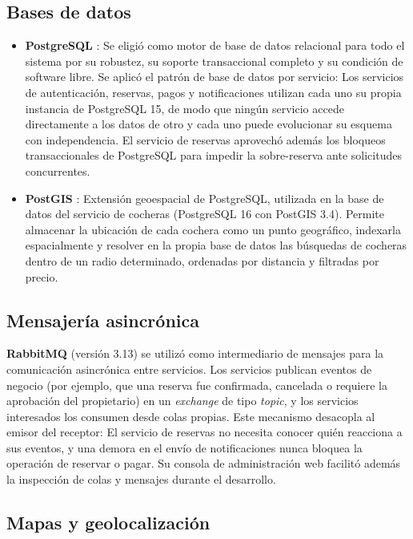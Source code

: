 \subsection{Bases de datos}

\begin{itemize}
    \item \textbf{PostgreSQL} \autocite{postgresql}: Se eligió como motor de base de datos relacional para todo el sistema por su robustez, su soporte transaccional completo y su condición de software libre. Se aplicó el patrón de base de datos por servicio: Los servicios de autenticación, reservas, pagos y notificaciones utilizan cada uno su propia instancia de PostgreSQL 15, de modo que ningún servicio accede directamente a los datos de otro y cada uno puede evolucionar su esquema con independencia. El servicio de reservas aprovechó además los bloqueos transaccionales de PostgreSQL para impedir la sobre-reserva ante solicitudes concurrentes.
    \item \textbf{PostGIS} \autocite{postgis}: Extensión geoespacial de PostgreSQL, utilizada en la base de datos del servicio de cocheras (PostgreSQL 16 con PostGIS 3.4). Permite almacenar la ubicación de cada cochera como un punto geográfico, indexarla espacialmente y resolver en la propia base de datos las búsquedas de cocheras dentro de un radio determinado, ordenadas por distancia y filtradas por precio.
\end{itemize}

\subsection{Mensajería asincrónica}

\textbf{RabbitMQ} \autocite{rabbitmq} (versión 3.13) se utilizó como intermediario de mensajes para la comunicación asincrónica entre servicios. Los servicios publican eventos de negocio (por ejemplo, que una reserva fue confirmada, cancelada o requiere la aprobación del propietario) en un \textit{exchange} de tipo \textit{topic}, y los servicios interesados los consumen desde colas propias. Este mecanismo desacopla al emisor del receptor: El servicio de reservas no necesita conocer quién reacciona a sus eventos, y una demora en el envío de notificaciones nunca bloquea la operación de reservar o pagar. Su consola de administración web facilitó además la inspección de colas y mensajes durante el desarrollo.

\subsection{Mapas y geolocalización}

